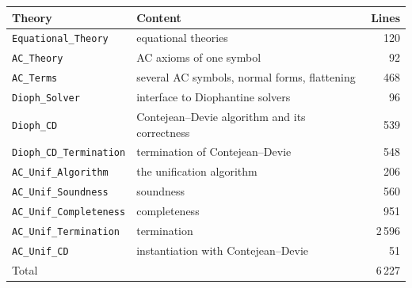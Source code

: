 \documentclass[11pt,a4paper]{article}
\theoremstyle{definition}
\theoremstyle{remark}
\newcommand{\isa}[1]{\mbox{\small\texttt{#1}}}
\begin{document}
\begin{center}
\begin{tabular}{@{}llr@{}}
  \toprule
  Theory & Content & Lines\\
  \midrule
  \isa{Equational\_Theory} & equational theories & 120\\
  \isa{AC\_Theory} & AC axioms of one symbol & 92\\
  \isa{AC\_Terms} & several AC symbols, normal forms, flattening & 468\\
  \isa{Dioph\_Solver} & interface to Diophantine solvers & 96\\
  \isa{Dioph\_CD} & Contejean--Devie algorithm and its correctness & 539\\
  \isa{Dioph\_CD\_Termination} & termination of Contejean--Devie & 548\\
  \isa{AC\_Unif\_Algorithm} & the unification algorithm & 206\\
  \isa{AC\_Unif\_Soundness} & soundness & 560\\
  \isa{AC\_Unif\_Completeness} & completeness & 951\\
  \isa{AC\_Unif\_Termination} & termination & 2\,596\\
  \isa{AC\_Unif\_CD} & instantiation with Contejean--Devie & 51\\
  \midrule
  Total & & 6\,227\\
  \bottomrule
\end{tabular}
\end{center}
\end{document}
